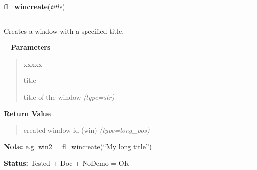 \hspace{.8\funcindent}\begin{boxedminipage}{\funcwidth}

    \raggedright \textbf{fl\_wincreate}(\textit{title})

    \vspace{-1.5ex}

    \rule{\textwidth}{0.5\fboxrule}
\setlength{\parskip}{2ex}

Creates a window with a specified title.

-{}-
\setlength{\parskip}{1ex}
      \textbf{Parameters}
      \vspace{-1ex}

      \begin{quote}
        \begin{Ventry}{xxxxx}

          \item[title]


title of the window
            {\it (type=str)}

        \end{Ventry}

      \end{quote}

      \textbf{Return Value}
    \vspace{-1ex}

      \begin{quote}

created window id (win)
      {\it (type=long\_pos)}

      \end{quote}

\textbf{Note:} 
e.g. win2 = fl\_wincreate(``My long title'')


\textbf{Status:} 
Tested + Doc + NoDemo = OK


    \end{boxedminipage}

    \label{xformslib:flxbasic:fl_winshow}

    \vspace{0.5ex}

